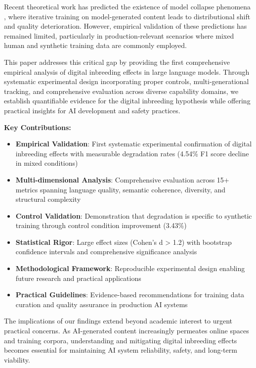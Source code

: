 \documentclass[11pt]{article}
\begin{document}
Recent theoretical work has predicted the existence of model collapse phenomena \citep{shumailov2023curse}, where iterative training on model-generated content leads to distributional shift and quality deterioration. However, empirical validation of these predictions has remained limited, particularly in production-relevant scenarios where mixed human and synthetic training data are commonly employed.

This paper addresses this critical gap by providing the first comprehensive empirical analysis of digital inbreeding effects in large language models. Through systematic experimental design incorporating proper controls, multi-generational tracking, and comprehensive evaluation across diverse capability domains, we establish quantifiable evidence for the digital inbreeding hypothesis while offering practical insights for AI development and safety practices.

\textbf{Key Contributions:}
\begin{itemize}
    \item \textbf{Empirical Validation}: First systematic experimental confirmation of digital inbreeding effects with measurable degradation rates (4.54\% F1 score decline in mixed conditions)
    \item \textbf{Multi-dimensional Analysis}: Comprehensive evaluation across 15+ metrics spanning language quality, semantic coherence, diversity, and structural complexity
    \item \textbf{Control Validation}: Demonstration that degradation is specific to synthetic training through control condition improvement (3.43\%)
    \item \textbf{Statistical Rigor}: Large effect sizes (Cohen's d > 1.2) with bootstrap confidence intervals and comprehensive significance analysis
    \item \textbf{Methodological Framework}: Reproducible experimental design enabling future research and practical applications
    \item \textbf{Practical Guidelines}: Evidence-based recommendations for training data curation and quality assurance in production AI systems
\end{itemize}

The implications of our findings extend beyond academic interest to urgent practical concerns. As AI-generated content increasingly permeates online spaces and training corpora, understanding and mitigating digital inbreeding effects becomes essential for maintaining AI system reliability, safety, and long-term viability.
\end{document}
